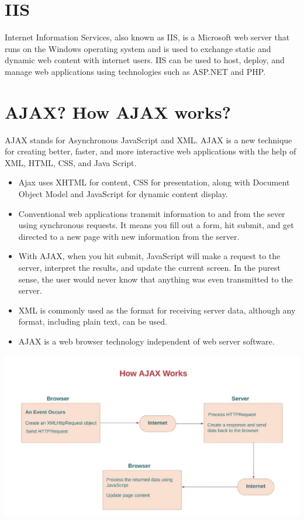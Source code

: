 \documentclass{article}
\begin{document}
\section{IIS}
Internet Information Services, also known as IIS, is a Microsoft web server that runs on the Windows operating system and is used to exchange static and dynamic web content with internet users. IIS can be used to host, deploy, and manage web applications using technologies such as ASP.NET and PHP.

\section{AJAX? How AJAX works?}
AJAX stands for Asynchronous JavaScript and XML. AJAX is a new technique for creating better, faster, and more interactive web applications with the help of XML, HTML, CSS, and Java Script.

\begin{itemize}
  \item Ajax uses XHTML for content, CSS for presentation, along with Document Object Model and JavaScript for dynamic content display.
  \item Conventional web applications transmit information to and from the sever using synchronous requests. It means you fill out a form, hit submit, and get directed to a new page with new information from the server.
  \item With AJAX, when you hit submit, JavaScript will make a request to the server, interpret the results, and update the current screen. In the purest sense, the user would never know that anything was even transmitted to the server.
  \item XML is commonly used as the format for receiving server data, although any format, including plain text, can be used.
  \item AJAX is a web browser technology independent of web server software.
\end{itemize}

\includegraphics[width=\textwidth]{WhatsApp Image 2023-01-12 at 08.55.03.jpeg}
\end{document}
